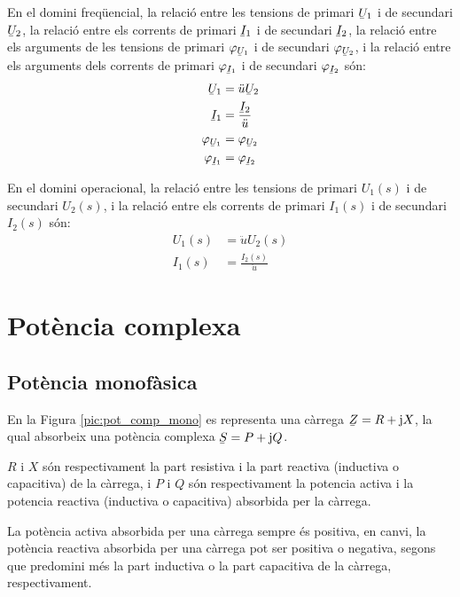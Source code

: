 En el domini
freq\"{u}encial, la relaci\'{o} entre les tensions de primari $\cmplx{U}_1$
i de secundari $\cmplx{U}_2$, la relaci\'{o} entre els corrents de
primari $\cmplx{I}_1$ i de secundari $\cmplx{I}_2$, la relaci\'{o} entre
els arguments de les tensions de primari $\varphi_{\cmplx{U}_1}$ i
de secundari $\varphi_{\cmplx{U}_2}$, i  la relaci\'{o} entre els
arguments dels corrents de primari $\varphi_{\cmplx{I}_1}$ i de
secundari $\varphi_{\cmplx{I}_2}$ s\'{o}n:
\begin{align}
   \cmplx{U}_1 &= \ddot{u} \cmplx{U}_2 \\
   \cmplx{I}_1 &= \frac{\cmplx{I}_2}{\ddot{u}} \\
   \varphi_{\cmplx{U}_1} &= \varphi_{\cmplx{U}_2} \\
   \varphi_{\cmplx{I}_1} &= \varphi_{\cmplx{I}_2}
\end{align}

 En el domini operacional, la relaci\'{o} entre les tensions de primari $U_1(s)$ i de secundari $U_2(s)$,  i la relaci\'{o} entre els corrents de primari $I_1(s)$ i de secundari $I_2(s)$ s\'{o}n:
\begin{align}
   U_1(s) &= \ddot{u} U_2(s) \\
   I_1(s) &= \frac{I_2(s)}{\ddot{u}}
\end{align}


\section{Pot\`{e}ncia complexa} 

\subsection{Pot\`{e}ncia monof\`{a}sica} 

En la Figura \vref{pic:pot_comp_mono} es representa una c\`{a}rrega $\cmplx{Z}=R+\ju X$, la
qual absorbeix una pot\`{e}ncia complexa $\cmplx{S} = P + \ju Q$.

$R$ i $X$ s\'{o}n respectivament la part resistiva i la part reactiva
(inductiva o capacitiva) de la c\`{a}rrega, i $P$ i $Q$ s\'{o}n
respectivament la potencia activa i la potencia reactiva (inductiva
o capacitiva) absorbida per la c\`{a}rrega.

La pot\`{e}ncia activa absorbida per una c\`{a}rrega sempre \'{e}s positiva, en
canvi, la pot\`{e}ncia reactiva absorbida per una c\`{a}rrega pot ser
positiva o negativa, segons que predomini m\'{e}s la part inductiva o la
part capacitiva de la c\`{a}rrega, respectivament.

